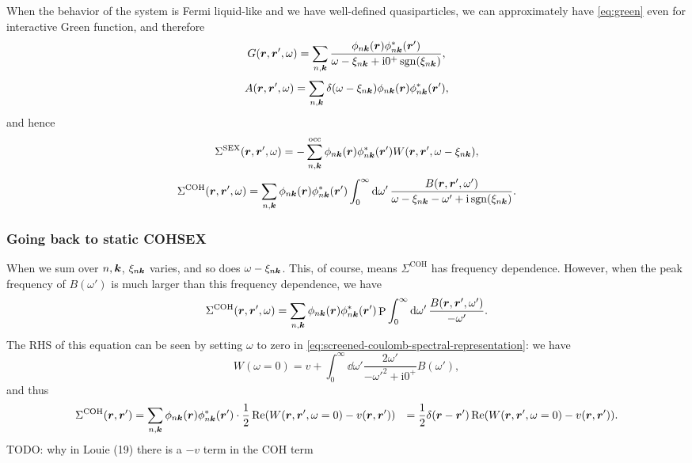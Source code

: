 \documentclass[hyperref, a4paper, 12pt]{report}
\DeclareMathOperator{\primevalue}{P}
\DeclareMathOperator{\sgn}{sgn}
\newcommand*{\ii}{\mathrm{i}}
\def\\{}%
\begin{document}
When the behavior of the system is Fermi liquid-like and we have well-defined quasiparticles,
we can approximately have \eqref{eq:green} even for interactive Green function,
and therefore 
\begin{equation}
    G(\vb*{r}, \vb*{r}', \omega)
    = \sum_{n, \vb*{k}} \frac{
        \phi_{n \vb*{k}}(\vb*{r}) \phi^*_{n \vb*{k}}(\vb*{r}')
    }{
        \omega - \xi_{n \vb*{k}} + \ii 0^+ \sgn(\xi_{n \vb*{k}})
    }, 
    \label{eq:interactive-green-quasiparticle}
\end{equation}
\begin{equation}
    A(\vb*{r}, \vb*{r}', \omega)
    = \sum_{n, \vb*{k}} \delta(\omega - \xi_{n \vb*{k}})
    \phi_{n \vb*{k}}(\vb*{r}) \phi^*_{n \vb*{k}}(\vb*{r}'),
\end{equation}
and hence 
\begin{equation}
    \Sigma^{\text{SEX}}(\vb*{r}, \vb*{r}', \omega)
    = - \sum_{n, \vb*{k}}^{\text{occ}}
    \phi_{n \vb*{k}}(\vb*{r}) \phi_{n \vb*{k}}^*(\vb*{r}') 
    W(\vb*{r}, \vb*{r}', \omega - \xi_{n \vb*{k}}), 
    \label{eq:sigma-sex-fermi-liquid}
\end{equation}
\begin{equation}
    \Sigma^{\text{COH}}(\vb*{r}, \vb*{r}', \omega)
    = \sum_{n, \vb*{k}} \phi_{n \vb*{k}}(\vb*{r}) \phi_{n \vb*{k}}^*(\vb*{r}')
    \int_{0}^{\infty} \dd{\omega'}
    \frac{B(\vb*{r}, \vb*{r}', \omega')}{\omega - \xi_{n \vb*{k}} - \omega' + \ii \sgn(\xi_{n \vb*{k}})}.
    \label{eq:sigma-coh-fermi-liquid}
\end{equation}

\subsubsection{Going back to static COHSEX}

When we sum over $n, \vb*{k}$,
$\xi_{n \vb*{k}}$ varies, 
and so does $\omega - \xi_{n \vb*{k}}$.
This, of course, means $\Sigma^{\text{COH}}$ has frequency dependence.
However, when the peak frequency of $B(\omega')$ 
is much larger than this frequency dependence,
we have 
\[
    \Sigma^{\text{COH}}(\vb*{r}, \vb*{r}', \omega)
    = \sum_{n, \vb*{k}} \phi_{n \vb*{k}}(\vb*{r}) \phi_{n \vb*{k}}^*(\vb*{r}')
    \primevalue \int_{0}^{\infty} \dd{\omega'}
    \frac{B(\vb*{r}, \vb*{r}', \omega')}{- \omega'}.
\]
The RHS of this equation can be seen by setting $\omega$ to zero in 
\eqref{eq:screened-coulomb-spectral-representation}:
we have 
\[
    W(\omega = 0) = v + \int_{0}^{\infty} \dd{\omega'} \frac{2 \omega'}{- \omega'^2 + \ii 0^+} B(\omega'),
\]
and thus 
\begin{equation}
    \begin{aligned}
        \Sigma^{\text{COH}}(\vb*{r}, \vb*{r}')
        &= \sum_{n, \vb*{k}} \phi_{n \vb*{k}}(\vb*{r}) \phi_{n \vb*{k}}^*(\vb*{r}') \cdot 
        \frac{1}{2} \Re (W(\vb*{r}, \vb*{r}', \omega = 0) - v(\vb*{r}, \vb*{r}')) \\
        &= \frac{1}{2} \delta(\vb*{r} - \vb*{r}') 
        \Re (W(\vb*{r}, \vb*{r}', \omega = 0) - v(\vb*{r}, \vb*{r}')) .
    \end{aligned}
\end{equation}
TODO: why in Louie (19) there is a $-v$ term in the COH term 
\end{document}
